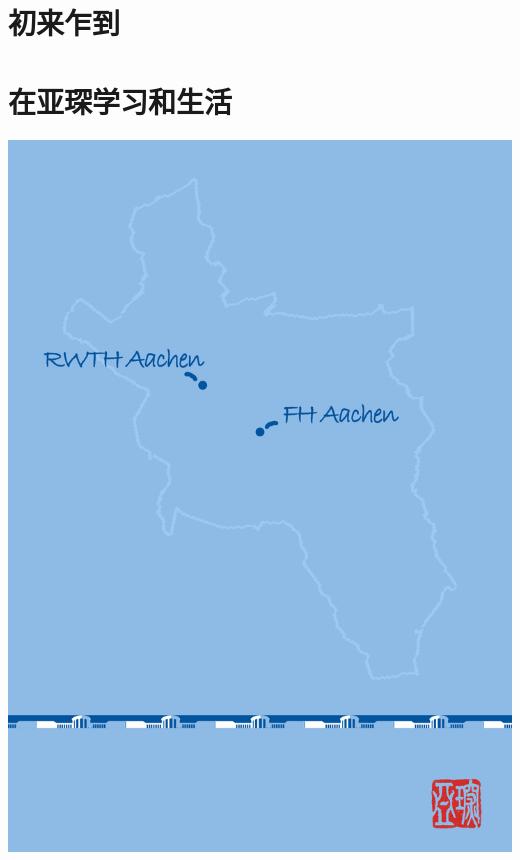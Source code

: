 \documentclass[a4paper,lang=cn,10pt,newtx,scheme=chinese]{elegantbook}
\begin{document}
\part{初来乍到}










\part{在亚琛学习和生活}



\nocite{*}

\printbibliography[heading=bibintoc, title=\ebibname]
\appendix

\begin{titlepage}
\parindent=0pt
\includegraphics[width=\linewidth]{Bilder/Back_Cover_.jpg}
\end{titlepage}
\end{document}
